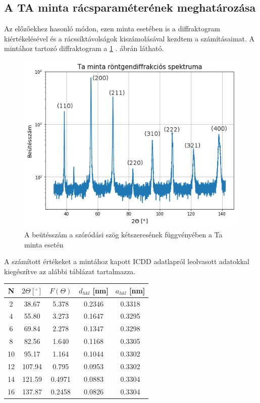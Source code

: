 \documentclass[12pt,a4paper]{article}
\begin{document}
\subsection{A TA minta rácsparaméterének meghatározása}
\hspace*{10pt} Az előzőekhez hasonló módon, ezen minta esetében is a diffraktogram kiértékelésével és a rácssíktávolságok kiszámolásával kezdtem a számításaimat. A mintához tartozó diffraktogram a \ref{fig:6} . ábrán látható.\\
\begin{figure}[!h]
\centering
\includegraphics[scale=0.75]{ta_ind}
\caption{A beütésszám a szóródási szög kétszeresének függvényében a Ta minta esetén}
\label{fig:6}
\end{figure}
\newline
A számított értékeket a mintához kapott ICDD adatlapról leolvasott adatokkal kiegészítve az alábbi táblázat tartalmazza.
\begin{table}[!h]
\begin{center}
\begin{tabular}{|c|c|c|c|c|}
\hline
N & $2\Theta [^{\circ}]$ & $F(\Theta)$ & $d_{hkl}$ [nm] & $a_{hkl}$ [nm]  \\
\hline
2 & 38.67 & 5.378 & 0.2346 & 0.3318 \\
\hline
4 & 55.80 & 3.273 & 0.1647 & 0.3295 \\
\hline
6 & 69.84 & 2.278 & 0.1347 & 0.3298 \\
\hline
8 & 82.56 & 1.640 & 0.1168 & 0.3305 \\
\hline
10 & 95.17 & 1.164 & 0.1044 & 0.3302 \\
\hline
12 & 107.94 & 0.795 & 0.0953 & 0.3302 \\
\hline
14 & 121.59 & 0.4971 & 0.0883 & 0.3304 \\
\hline
16 & 137.87 & 0.2458 & 0.0826 & 0.3304 \\
\hline
\end{tabular}
\end{center}
\end{table}
\end{document}
